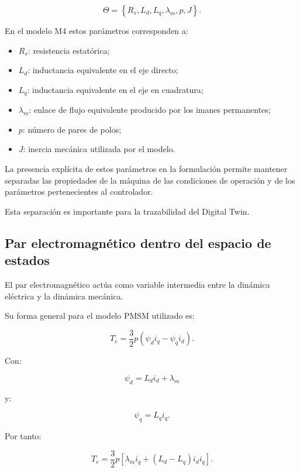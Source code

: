 \begin{equation}
\Theta =
\left\{
R_s,
L_d,
L_q,
\lambda_m,
p,
J
\right\}.
\end{equation}

En el modelo M4 estos parámetros corresponden a:

\begin{itemize}
    \item $R_s$: resistencia estatórica;
    \item $L_d$: inductancia equivalente en el eje directo;
    \item $L_q$: inductancia equivalente en el eje en cuadratura;
    \item $\lambda_m$: enlace de flujo equivalente producido por los imanes permanentes;
    \item $p$: número de pares de polos;
    \item $J$: inercia mecánica utilizada por el modelo.
\end{itemize}

La presencia explícita de estos parámetros en la formulación permite mantener separadas las propiedades de la máquina de las condiciones de operación y de los parámetros pertenecientes al controlador.

Esta separación es importante para la trazabilidad del Digital Twin.

\subsection{Par electromagnético dentro del espacio de estados}

El par electromagnético actúa como variable intermedia entre la dinámica eléctrica y la dinámica mecánica.

Su forma general para el modelo PMSM utilizado es:

\begin{equation}
T_e
=
\frac{3}{2}p
\left(
\psi_di_q-\psi_qi_d
\right).
\end{equation}

Con:

\begin{equation}
\psi_d=L_di_d+\lambda_m
\end{equation}

y:

\begin{equation}
\psi_q=L_qi_q.
\end{equation}

Por tanto:

\begin{equation}
T_e
=
\frac{3}{2}p
\left[
\lambda_mi_q+
(L_d-L_q)i_di_q
\right].
\end{equation}

